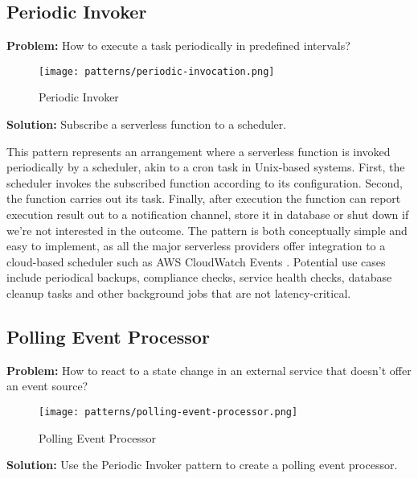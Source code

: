\subsection{Periodic Invoker} \label{subsec:periodicInvocation}

\textbf{Problem:} How to execute a task periodically in predefined intervals?

\begin{figure}[h]
  \centering
  \texttt{[image: patterns/periodic-invocation.png]}
  \caption{Periodic Invoker}
  \label{fig:patternPeriodicInvocation}
\end{figure}

\textbf{Solution:} Subscribe a serverless function to a scheduler.

This pattern represents an arrangement where a serverless function is invoked periodically by a scheduler, akin to a cron task in Unix-based systems. First, the scheduler invokes the subscribed function according to its configuration. Second, the function carries out its task. Finally, after execution the function can report execution result out to a notification channel, store it in database or shut down if we're not interested in the outcome. The pattern is both conceptually simple and easy to implement, as all the major serverless providers offer integration to a cloud-based scheduler such as AWS CloudWatch Events \parencite{awslambda0218}. Potential use cases include periodical backups, compliance checks, service health checks, database cleanup tasks and other background jobs that are not latency-critical. \parencite{hong18securingviaserverlesspatterns}

\subsection{Polling Event Processor} \label{subsec:PollingEventProcessor}

\textbf{Problem:} How to react to a state change in an external service that doesn't offer an event source?

\begin{figure}[h]
  \centering
  \texttt{[image: patterns/polling-event-processor.png]}
  \caption{Polling Event Processor}
  \label{fig:PollingEventProcessor}
\end{figure}

\textbf{Solution:} Use the Periodic Invoker pattern to create a polling event processor.

